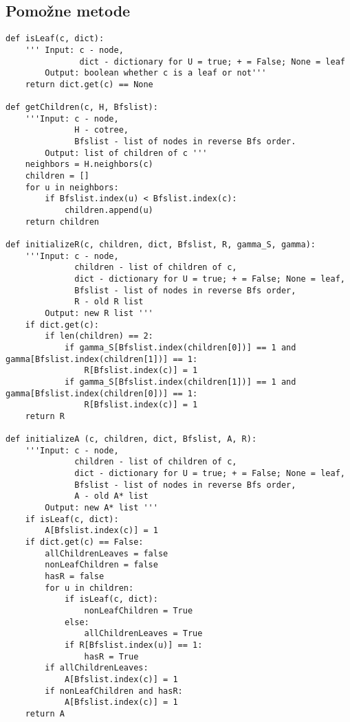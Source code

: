 \documentclass[12pt,a4paper,twoside]{article}
\theoremstyle{definition} %
\theoremstyle{plain} %
\numberwithin{equation}{section}  %
\begin{document}
\subsection*{Pomožne metode}
\begin{verbatim}
def isLeaf(c, dict):
    ''' Input: c - node,
               dict - dictionary for U = true; + = False; None = leaf
        Output: boolean whether c is a leaf or not'''
    return dict.get(c) == None

def getChildren(c, H, Bfslist):
    '''Input: c - node,
              H - cotree,
              Bfslist - list of nodes in reverse Bfs order. 
        Output: list of children of c '''
    neighbors = H.neighbors(c)
    children = []
    for u in neighbors:
        if Bfslist.index(u) < Bfslist.index(c):
            children.append(u)
    return children

def initializeR(c, children, dict, Bfslist, R, gamma_S, gamma):
    '''Input: c - node,
              children - list of children of c,
              dict - dictionary for U = true; + = False; None = leaf,
              Bfslist - list of nodes in reverse Bfs order,
              R - old R list
        Output: new R list '''
    if dict.get(c):
        if len(children) == 2:
            if gamma_S[Bfslist.index(children[0])] == 1 and gamma[Bfslist.index(children[1])] == 1:
                R[Bfslist.index(c)] = 1
            if gamma_S[Bfslist.index(children[1])] == 1 and gamma[Bfslist.index(children[0])] == 1:
                R[Bfslist.index(c)] = 1
    return R

def initializeA (c, children, dict, Bfslist, A, R):
    '''Input: c - node,
              children - list of children of c,
              dict - dictionary for U = true; + = False; None = leaf,
              Bfslist - list of nodes in reverse Bfs order,
              A - old A* list
        Output: new A* list '''
    if isLeaf(c, dict):
        A[Bfslist.index(c)] = 1
    if dict.get(c) == False:
        allChildrenLeaves = false
        nonLeafChildren = false
        hasR = false
        for u in children:
            if isLeaf(c, dict):
                nonLeafChildren = True
            else:
                allChildrenLeaves = True
            if R[Bfslist.index(u)] == 1:
                hasR = True
        if allChildrenLeaves:
            A[Bfslist.index(c)] = 1
        if nonLeafChildren and hasR:
            A[Bfslist.index(c)] = 1
    return A
    

\end{verbatim}
\end{document}
